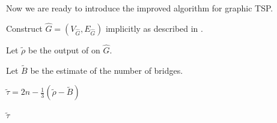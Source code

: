 \documentclass[letterpaper,11pt]{article}
\begin{document}
Now we are ready to introduce the improved algorithm for graphic TSP.

\begin{algorithm}
\caption{Improved algorithm for graphic TSP.}
\label{alg: graphic-tsp2}
    Construct $\hat{G} = (V_{\hat{G}}, E_{\hat{G}})$ implicitly as described in .
    
    Let $\tilde{\rho}$ be the output of  on $\hat{G}$.
    
    Let $\tilde{B}$ be the estimate of the number of bridges. 
    
    $\tilde{\tau} = 2n - \frac{1}{3}(\tilde{\rho} - \tilde{B})$
    
    \Return $\tilde{\tau}$
\end{algorithm}
\end{document}
